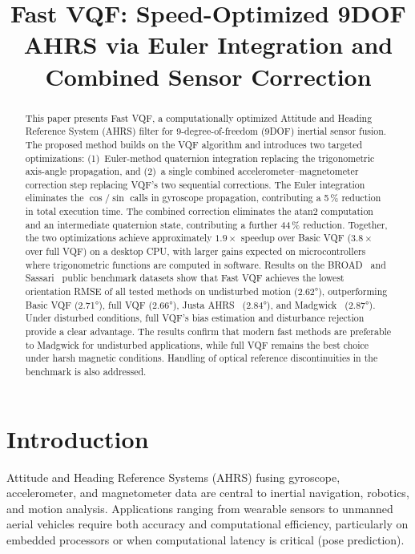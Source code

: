 \documentclass[conference]{IEEEtran}
\title{Fast VQF: Speed-Optimized 9DOF AHRS via Euler Integration and Combined Sensor Correction}
\author{
\IEEEauthorblockN{Josef Justa, Václav Šmídl, Member, IEEE}
}
\begin{document}
\maketitle

\begin{abstract}
This paper presents Fast VQF, a computationally optimized Attitude and Heading Reference System (AHRS) filter for 9-degree-of-freedom (9DOF) inertial sensor fusion. The proposed method builds on the VQF algorithm and introduces two targeted optimizations: (1)~Euler-method quaternion integration replacing the trigonometric axis-angle propagation, and (2)~a single combined accelerometer--magnetometer correction step replacing VQF's two sequential corrections. The Euler integration eliminates the $\cos/\sin$ calls in gyroscope propagation, contributing a 5\,\% reduction in total execution time. The combined correction eliminates the $\mathrm{atan2}$ computation and an intermediate quaternion state, contributing a further 44\,\% reduction. Together, the two optimizations achieve approximately $1.9\times$ speedup over Basic VQF ($3.8\times$ over full VQF) on a desktop CPU, with larger gains expected on microcontrollers where trigonometric functions are computed in software. Results on the BROAD~\cite{laidig2021broad} and Sassari~\cite{caruso2021sassari} public benchmark datasets show that Fast VQF achieves the lowest orientation RMSE of all tested methods on undisturbed motion (2.62°), outperforming Basic VQF (2.71°), full VQF (2.66°), Justa AHRS~\cite{justa2020} (2.84°), and Madgwick~\cite{madgwick2010} (2.87°). Under disturbed conditions, full VQF's bias estimation and disturbance rejection provide a clear advantage. The results confirm that modern fast methods are preferable to Madgwick for undisturbed applications, while full VQF remains the best choice under harsh magnetic conditions. Handling of optical reference discontinuities in the benchmark is also addressed.
\end{abstract}

\section{Introduction}

Attitude and Heading Reference Systems (AHRS) fusing gyroscope, accelerometer, and magnetometer 
data are central to inertial navigation, robotics, and motion analysis. Applications ranging from 
wearable sensors to unmanned aerial vehicles require both accuracy and computational efficiency, 
particularly on embedded processors or when computational latency is critical (pose prediction).
\end{document}

